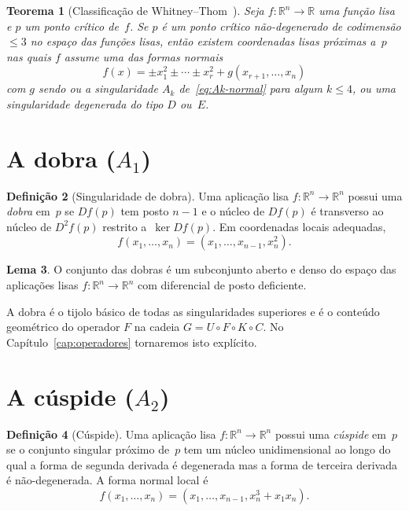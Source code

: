 \documentclass[12pt,a4paper,twoside]{book}
\theoremstyle{plain}
\newtheorem{teorema}{Teorema}[section]
\theoremstyle{definition}
\newtheorem{lema}[teorema]{Lema}
\theoremstyle{definition}
\newtheorem{definicao}[teorema]{Definição}
\newcommand{\R}{\mathbb{R}}
\begin{document}
\begin{teorema}[Classificação de Whitney--Thom~\cite{Arnold1985}]
\label{thm:whitney}
Seja $f : \R^{n} \to \R$ uma função lisa e $p$ um ponto crítico de~$f$.
Se $p$ é um ponto crítico não-degenerado de codimensão $\le 3$ no espaço
das funções lisas, então existem coordenadas lisas próximas a~$p$ nas
quais $f$ assume uma das formas normais
\[
  f(x) = \pm x_{1}^{2} \pm \cdots \pm x_{r}^{2} + g(x_{r+1},\dots,x_{n})
\]
com $g$ sendo ou a singularidade $A_{k}$ de~\eqref{eq:Ak-normal} para
algum $k \le 4$, ou uma singularidade degenerada do tipo $D$ ou~$E$.
\end{teorema}

\section{A dobra ($A_{1}$)}
\label{sec:dobra}

\begin{definicao}[Singularidade de dobra]\label{def:dobra}
Uma aplicação lisa $f : \R^{n} \to \R^{n}$ possui uma \emph{dobra} em~$p$
se $Df(p)$ tem posto $n-1$ e o núcleo de $Df(p)$ é transverso ao núcleo
de $D^{2}f(p)$ restrito a~$\ker Df(p)$. Em coordenadas locais adequadas,
\[
  f(x_{1},\dots,x_{n}) = (x_{1},\dots,x_{n-1},x_{n}^{2}).
\]
\end{definicao}

\begin{lema}\label{lem:dobra-tipica}
O conjunto das dobras é um subconjunto aberto e denso do espaço das
aplicações lisas $f : \R^{n} \to \R^{n}$ com diferencial de posto deficiente.
\end{lema}

A dobra é o tijolo básico de todas as singularidades superiores e é o
conteúdo geométrico do operador $F$ na cadeia
$G = U \circ F \circ K \circ C$. No Capítulo~\ref{cap:operadores}
tornaremos isto explícito.

\section{A cúspide ($A_{2}$)}

\begin{definicao}[Cúspide]\label{def:cuspide}
Uma aplicação lisa $f : \R^{n} \to \R^{n}$ possui uma \emph{cúspide} em~$p$
se o conjunto singular próximo de~$p$ tem um núcleo unidimensional ao
longo do qual a forma de segunda derivada é degenerada mas a forma de
terceira derivada é não-degenerada. A forma normal local é
\[
  f(x_{1},\dots,x_{n}) = (x_{1},\dots,x_{n-1}, x_{n}^{3} + x_{1}x_{n}).
\]
\end{definicao}
\end{document}
